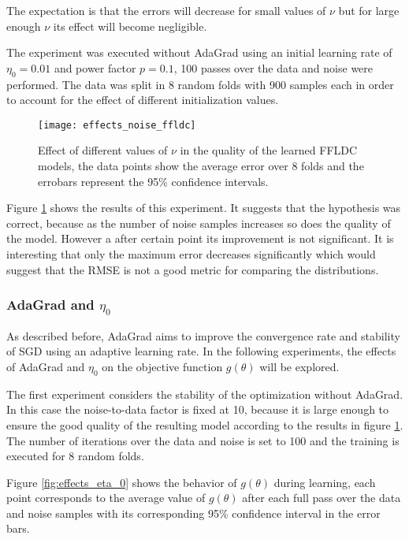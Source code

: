 The expectation is that the errors will decrease for small values of $\nu$ but for large enough $\nu$ its effect will become negligible.

The experiment was executed without AdaGrad using an initial learning rate of $\eta_{0} = 0.01$ and power factor $p = 0.1$, 100 passes over the data and noise were performed. The data was split in 8 random folds with 900 samples each in order to account for the effect of different initialization values.

\begin{figure}
  \centering
  \texttt{[image: effects\_noise\_ffldc]}
  \caption{Effect of different values of $\nu$ in the quality of the learned FFLDC models, the data points show the average error over 8 folds and the errobars represent the 95\% confidence intervals.}
  \label{fig:effects_noise_ffldc}
\end{figure}

Figure \ref{fig:effects_noise_ffldc} shows the results of this experiment. It suggests that the hypothesis was correct, because as the number of noise samples increases so does the quality of the model. However a after certain point its improvement is not significant. It is interesting that only the maximum error decreases significantly which would suggest that the RMSE is not a good metric for comparing the distributions.

\subsubsection{AdaGrad and $\eta_0$}

As described before, AdaGrad aims to improve the convergence rate and stability of SGD using an adaptive learning rate. In the following experiments, the effects of AdaGrad and $\eta_{0}$ on the objective function $g(\theta)$ will be explored.

The first experiment considers the stability of the optimization without AdaGrad. In this case the noise-to-data factor is fixed at 10, because it is large enough to ensure the good quality of the resulting model according to the results in figure \ref{fig:effects_noise_ffldc}. The number of iterations over the data and noise is set to 100 and the training is executed for 8 random folds.

Figure \ref{fig:effects_eta_0} shows the behavior of $g(\theta)$ during learning, each point corresponds to the average value of $g(\theta)$ after each full pass over the data and noise samples with its corresponding 95\% confidence interval in the error bars.

